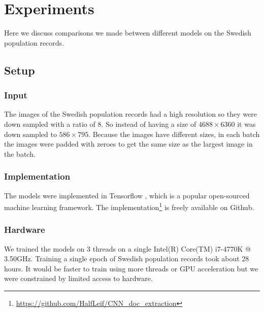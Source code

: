 







\section{Experiments}

Here we discuss comparisons we made between different models on the Swedish population records.

\subsection{Setup}


\subsubsection{Input}
The images of the Swedish population records had a high resolution so they were down sampled with a ratio of 8. So instead of having a size of $4688 \times 6360$ it was down sampled to $586 \times 795$. Because the images have different sizes, in each batch the images were padded with zeroes to get the same size as the largest image in the batch.

\subsubsection{Implementation}
The models were implemented in Tensorflow \cite{Tensorflow}, which is a popular open-sourced machine learning framework. The implementation\footnote{\url{https://github.com/HalfLeif/CNN_doc_extraction}} is freely available on Github.

\subsubsection{Hardware}
We trained the models on 3 threads on a single Intel(R) Core(TM) i7-4770K @ 3.50GHz. Training a single epoch of Swedish population records took about 28 hours. It would be faster to train using more threads or GPU acceleration but we were constrained by limited access to hardware.



